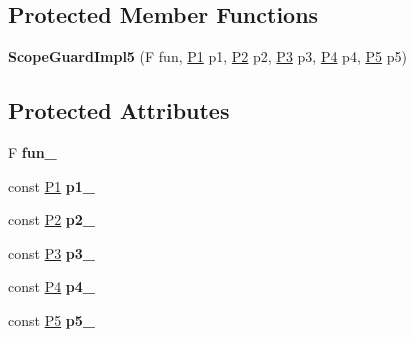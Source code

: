 \subsection*{Protected Member Functions}
\begin{DoxyCompactItemize}
\item 
\hypertarget{classLoki_1_1ScopeGuardImpl5_a417d20e0b0e7cd51e07a067d3724ab95}{}{\bfseries Scope\+Guard\+Impl5} (F fun, \hyperlink{structP1}{P1} p1, \hyperlink{structP2}{P2} p2, \hyperlink{structP3}{P3} p3, \hyperlink{structP4}{P4} p4, \hyperlink{structP5}{P5} p5)\label{classLoki_1_1ScopeGuardImpl5_a417d20e0b0e7cd51e07a067d3724ab95}

\end{DoxyCompactItemize}
\subsection*{Protected Attributes}
\begin{DoxyCompactItemize}
\item 
\hypertarget{classLoki_1_1ScopeGuardImpl5_aa81430fdabb0c6b280faa11f3c48fa81}{}F {\bfseries fun\+\_\+}\label{classLoki_1_1ScopeGuardImpl5_aa81430fdabb0c6b280faa11f3c48fa81}

\item 
\hypertarget{classLoki_1_1ScopeGuardImpl5_a5a023948f8a570838dc03599c63eb4d6}{}const \hyperlink{structP1}{P1} {\bfseries p1\+\_\+}\label{classLoki_1_1ScopeGuardImpl5_a5a023948f8a570838dc03599c63eb4d6}

\item 
\hypertarget{classLoki_1_1ScopeGuardImpl5_a27d9f4eadfc4e045ecb611ce6520d5b6}{}const \hyperlink{structP2}{P2} {\bfseries p2\+\_\+}\label{classLoki_1_1ScopeGuardImpl5_a27d9f4eadfc4e045ecb611ce6520d5b6}

\item 
\hypertarget{classLoki_1_1ScopeGuardImpl5_a608e4b8f0cffb669d182639e8e36e13c}{}const \hyperlink{structP3}{P3} {\bfseries p3\+\_\+}\label{classLoki_1_1ScopeGuardImpl5_a608e4b8f0cffb669d182639e8e36e13c}

\item 
\hypertarget{classLoki_1_1ScopeGuardImpl5_a8589bb304206af59277cddb94a09c5d6}{}const \hyperlink{structP4}{P4} {\bfseries p4\+\_\+}\label{classLoki_1_1ScopeGuardImpl5_a8589bb304206af59277cddb94a09c5d6}

\item 
\hypertarget{classLoki_1_1ScopeGuardImpl5_a61d9b25ffd1defc54f21f44714f7006c}{}const \hyperlink{structP5}{P5} {\bfseries p5\+\_\+}\label{classLoki_1_1ScopeGuardImpl5_a61d9b25ffd1defc54f21f44714f7006c}

\end{DoxyCompactItemize}
